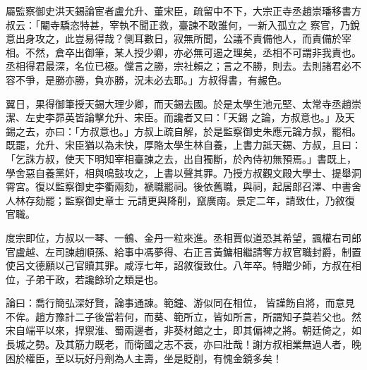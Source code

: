 \begin{pinyinscope}
 屬監察御史洪天錫論宦者盧允升、董宋臣，疏留中不下，大宗正寺丞趙崇璠移書方叔云：「閹寺驕恣特甚，宰執不聞正救，臺諫不敢誰何，一新入孤立之
 察官，乃銳意出身攻之，此豈易得哉？側耳數日，寂無所聞，公議不責備他人，而責備於宰相。不然，倉卒出御筆，某人授少卿，亦必無可遏之理矣，丞相不可謂非我責也。丞相得君最深，名位已極。儻言之勝，宗社賴之；言之不勝，則去。去則諸君必不容不爭，是勝亦勝，負亦勝，況未必去耶。」方叔得書，有赧色。



 翼日，果得御筆授天錫大理少卿，而天錫去國。於是太學生池元堅、太常寺丞趙崇潔、左史李昴英皆論擊允升、宋臣。而讒者又曰：「天錫
 之論，方叔意也。」及天錫之去，亦曰：「方叔意也。」方叔上疏自解，於是監察御史朱應元論方叔，罷相。既罷，允升、宋臣猶以為未快，厚賂太學生林自養，上書力詆天錫、方叔，且曰：「乞誅方叔，使天下明知宰相臺諫之去，出自獨斷，於內侍初無預焉。」書既上，學舍惡自養黨奸，相與鳴鼓攻之，上書以聲其罪。乃授方叔觀文殿大學士、提舉洞霄宮。復以監察御史李衢兩劾，褫職罷祠。後依舊職，與祠，起居郎召澤、中書舍人林存劾罷；監察御史章士
 元請更與降削，竄廣南。景定二年，請致仕，乃敘復官職。



 度宗即位，方叔以一琴、一鶴、金丹一粒來進。丞相賈似道恐其希望，諷權右司郎官盧越、左司諫趙順孫、給事中馮夢得、右正言黃鏞相繼請奪方叔官職封爵，制置使呂文德願以己官贖其罪。咸淳七年，詔敘復致仕。八年卒。特贈少師，方叔在相位，子弟干政，若讒餘玠之類是也。



 論曰：喬行簡弘深好賢，論事通諫。範鐘、游似同在相位，
 皆謹飭自將，而意見不侔。趙方豫計二子後當若何，而葵、範所立，皆如所言，所謂知子莫若父也。然宋自端平以來，捍禦淮、蜀兩邊者，非葵材館之士，即其偏裨之將。朝廷倚之，如長城之勢。及其筋力既老，而衛國之志不衰，亦曰壯哉！謝方叔相業無過人者，晚困於權臣，至以玩好丹劑為人主壽，坐是貶削，有愧金鏡多矣！



\end{pinyinscope}